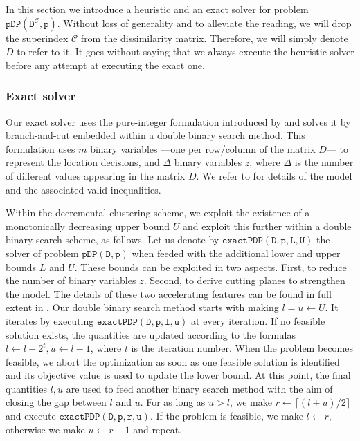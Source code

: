 \documentclass[a4paper,10pt]{article}
\newcommand{\pdp}[2]{$\mathtt{pDP({#1}, {#2})}$}
\newcommand{\mC}{\mathcal{C}}
\newcommand{\DmC}{D^{\mC}}
\newcommand{\exactPDP}[4]{$\mathtt{exactPDP({#1}, {#2}, {#3}, {#4})}$}
\begin{document}
In this section we introduce a heuristic and an exact solver for problem \pdp{\DmC}{p}. Without loss of generality and to alleviate the reading, we will drop the superindex $\mC$ from the dissimilarity matrix. Therefore, we will simply denote $D$ to refer to it. It goes without saying that we always execute the heuristic solver before any attempt at executing the exact one.

\subsubsection{Exact solver}

Our exact solver uses the pure-integer formulation introduced by \citet{Sayah2017new} and solves it by branch-and-cut embedded within a double binary search method. This formulation uses $m$ binary variables ---one per row/column of the matrix $D$--- to represent the location decisions, and $\Delta$ binary variables $z$, where $\Delta$ is the number of different values appearing in the matrix $D$. We refer to \citet{Sayah2017new} for details of the model and the associated valid inequalities.

Within the decremental clustering scheme, we exploit the existence of a monotonically decreasing upper bound $U$ and exploit this further within a double binary search scheme, as follows. Let us denote by \exactPDP{D}{p}{L}{U} the solver of problem \pdp{D}{p} when feeded with the additional lower and upper bounds $L$ and $U$. These bounds can be exploited in two aspects. First, to reduce the number of binary variables $z$. Second, to derive cutting planes to strengthen the model. The details of these two accelerating features can be found in full extent in \citet{Sayah2017new}. Our double binary search method starts with making $l = u \leftarrow U$. It iterates by executing \exactPDP{D}{p}{l}{u} at every iteration. If no feasible solution exists, the quantities are updated according to the formulas $l\leftarrow l - 2^t, u \leftarrow l - 1$, where $t$ is the iteration number. When the problem becomes feasible, we abort the optimization as soon as one feasible solution is identified and its objective value is used to update the lower bound. At this point, the final quantities $l, u$ are used to feed another binary search method with the aim of closing the gap between $l$ and $u$. For as long as $u > l$, we make $r\leftarrow \lceil (l + u) / 2\rceil$ and execute \exactPDP{D}{p}{r}{u}. If the problem is feasible, we make $l\leftarrow r$, otherwise we make $u\leftarrow r - 1$ and repeat.
\end{document}

